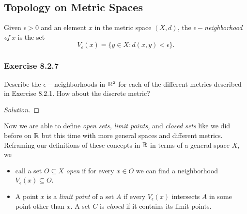 \subsection{Topology on Metric Spaces}

\begin{definition}
    Given \( \epsilon > 0  \) and an element \( x  \) in the metric space \( (X,d) \), the \( \epsilon- \)\textit{neighborhood of} \( x  \)  is the set 
    \[  V_{\epsilon }(x) = \{ y \in X : d(x,y) < \epsilon \}. \]
\end{definition}

\subsubsection{Exercise 8.2.7} Describe the \( \epsilon - \)neighborhoods in \( \mathbb{R}^{2} \) for each of the different metrics described in Exercise 8.2.1. How about the discrete metric?
\begin{proof}[Solution]

\end{proof}

Now we are able to define \textit{open sets, limit points,} and \textit{closed sets} like we did before on \( \mathbb{R}  \) but this time with more general spaces and different metrics. 
Reframing our definitions of these concepts in \( \mathbb{R}  \) in terms of a general space \( X  \), we 
\begin{itemize}
    \item call a set \( O \subseteq X  \) \textit{open} if for every \( x \in O  \) we can find a neighborhood \( V_{\epsilon }(x) \subseteq O  \). 
    \item A point \( x  \) is a \textit{limit point} of a set \( A  \) if every \( V_{\epsilon }(x)  \) intersects \( A  \) in some point other than \( x  \). A set \( C  \) is \textit{closed} if it contains its limit points.
\end{itemize}

